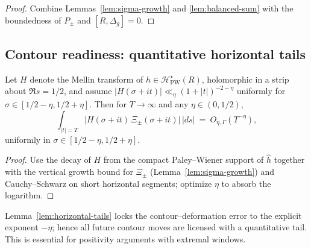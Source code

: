 \begin{proof}
Combine Lemmas~\ref{lem:sigma-growth} and \ref{lem:balanced-sum} with the boundedness of $P_\pm$ and $[R,\Delta_g]=0$. %
\end{proof}


\subsection{Contour readiness: quantitative horizontal tails}
\label{subsec:ch6-part1-contour} \relax \hspace{0pt}
\begin{lemma}
\label{lem:horizontal-tails}
Let $H$ denote the Mellin transform of $h\in\mathcal H_{\mathrm{PW}}^\star(R)$, holomorphic in a strip about $\Re s=1/2$, and assume $|H(\sigma+it)|\ll_\eta (1+|t|)^{-2-\eta}$ uniformly for $\sigma\in[1/2-\eta,1/2+\eta]$. Then for $T\to\infty$ and any $\eta\in(0,1/2)$,
\[
\int_{|t|=T}\! \big| H(\sigma+it)\, \Xi_\pm(\sigma+it)\big|\,|ds|\ =\ O_{\eta,\Gamma}(T^{-\eta}),
\]
uniformly in $\sigma\in[1/2-\eta,1/2+\eta]$. 
\end{lemma}

\begin{proof}
Use the decay of $H$ from the compact Paley–Wiener support of $\widehat h$ together with the vertical growth bound for $\Xi_\pm$ (Lemma~\ref{lem:sigma-growth}) and Cauchy–Schwarz on short horizontal segments; optimize $\eta$ to absorb the logarithm. %
\end{proof}

\begin{remark}
\label{rem:contour-policy}
Lemma~\ref{lem:horizontal-tails} locks the contour–deformation error to the explicit exponent $-\eta$; hence all future contour moves are licensed with a quantitative tail. This is essential for positivity arguments with extremal windows. %
\end{remark}


